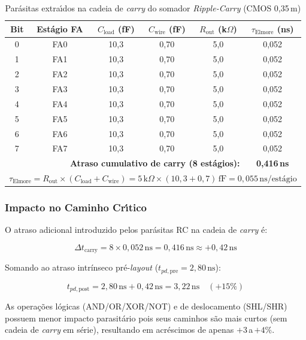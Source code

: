 \documentclass[12pt,a4paper]{article}
\begin{document}
\begin{table}[h!]
\centering
\caption{Par\'{a}sitas extra\'{\i}dos na cadeia de \textit{carry} do somador \textit{Ripple-Carry} (CMOS 0,35\,\textmu m)}
\label{tab:parasitas}
\begin{tabular}{cccccc}
\toprule
\textbf{Bit} & \textbf{Est\'{a}gio FA} & \textbf{$C_{\text{load}}$ (fF)} & \textbf{$C_{\text{wire}}$ (fF)} & \textbf{$R_{\text{out}}$ (k$\Omega$)} & \textbf{$\tau_{\text{Elmore}}$ (ns)} \\
\midrule
0 & FA0 & 10,3 & 0,70 & 5,0 & 0,052 \\
1 & FA1 & 10,3 & 0,70 & 5,0 & 0,052 \\
2 & FA2 & 10,3 & 0,70 & 5,0 & 0,052 \\
3 & FA3 & 10,3 & 0,70 & 5,0 & 0,052 \\
4 & FA4 & 10,3 & 0,70 & 5,0 & 0,052 \\
5 & FA5 & 10,3 & 0,70 & 5,0 & 0,052 \\
6 & FA6 & 10,3 & 0,70 & 5,0 & 0,052 \\
7 & FA7 & 10,3 & 0,70 & 5,0 & 0,052 \\
\midrule
\multicolumn{5}{r}{\textbf{Atraso cumulativo de carry (8 est\'{a}gios):}} & \textbf{0,416\,ns} \\
\bottomrule
\multicolumn{6}{r}{\small $\tau_{\text{Elmore}} = R_{\text{out}} \times (C_{\text{load}} + C_{\text{wire}}) = 5\,\text{k}\Omega \times (10{,}3 + 0{,}7)\,\text{fF} = 0{,}055\,\text{ns/est\'{a}gio}$}
\end{tabular}
\end{table}

\subsubsection{Impacto no Caminho Cr\'{\i}tico}

O atraso adicional introduzido pelos par\'{a}sitas RC na cadeia de \textit{carry} \'{e}:

\[
  \Delta t_{\text{carry}} = 8 \times 0{,}052\,\text{ns} = 0{,}416\,\text{ns} \approx +0{,}42\,\text{ns}
\]

Somando ao atraso intrínseco pr\'{e}-\textit{layout} ($t_{pd,\text{pre}} = 2{,}80\,\text{ns}$):

\[
  t_{pd,\text{post}} = 2{,}80\,\text{ns} + 0{,}42\,\text{ns} = 3{,}22\,\text{ns} \quad (+15\%)
\]

As opera\c{c}\~{o}es l\'{o}gicas (AND/OR/XOR/NOT) e de deslocamento (SHL/SHR) possuem menor impacto parasit\'{a}rio pois seus caminhos s\~{a}o mais curtos (sem cadeia de \textit{carry} em s\'{e}rie), resultando em acr\'{e}scimos de apenas $+3$\,a\,$+4\%$.
\end{document}
